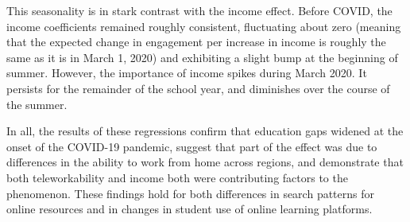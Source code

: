     This seasonality is in stark contrast with the income effect.
    Before COVID, the income coefficients remained roughly consistent, fluctuating about zero (meaning that the expected change in engagement per increase in income is roughly the same as it is in March 1, 2020) and exhibiting a slight bump at the beginning of summer.
    However, the importance of income spikes during March 2020.
    It persists for the remainder of the school year, and diminishes over the course of the summer.

In all, the results of these regressions confirm that education gaps widened at the onset of the COVID-19 pandemic, suggest that part of the effect was due to differences in the ability to work from home across regions, and demonstrate that both teleworkability and income both were contributing factors to the phenomenon.
These findings hold for both differences in search patterns for online resources and in changes in student use of online learning platforms.

\if{}


\fi



